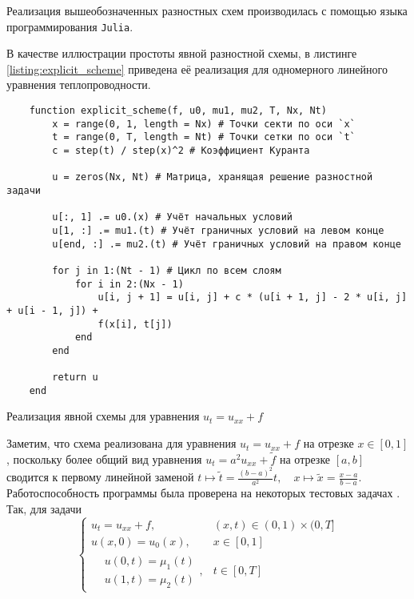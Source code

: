 
Реализация вышеобозначенных разностных схем производилась с помощью языка программирования \texttt{Julia}\cite{bezanson2017julia}. 

В качестве иллюстрации простоты явной разностной схемы, в листинге \ref{listing:explicit_scheme} приведена её реализация для одномерного линейного уравнения теплопроводности.
\begin{listing}
    \begin{verbatim}
    function explicit_scheme(f, u0, mu1, mu2, T, Nx, Nt)
        x = range(0, 1, length = Nx) # Точки секти по оси `x`
        t = range(0, T, length = Nt) # Точки сетки по оси `t`
        c = step(t) / step(x)^2 # Коэффициент Куранта
    
        u = zeros(Nx, Nt) # Матрица, хранящая решение разностной задачи
    
        u[:, 1] .= u0.(x) # Учёт начальных условий
        u[1, :] .= mu1.(t) # Учёт граничных условий на левом конце
        u[end, :] .= mu2.(t) # Учёт граничных условий на правом конце
    
        for j in 1:(Nt - 1) # Цикл по всем слоям
            for i in 2:(Nx - 1)
                u[i, j + 1] = u[i, j] + c * (u[i + 1, j] - 2 * u[i, j] + u[i - 1, j]) + 
                f(x[i], t[j])
            end
        end
    
        return u
    end
    \end{verbatim}
    \caption{Реализация явной схемы для уравнения $u_t = u_{xx} + f$}
    \label{listing:explicit_scheme}
\end{listing}
Заметим, что схема реализована для уравнения $u_t = u_{xx} + f$ на отрезке $x \in [0, 1]$, поскольку более общий вид уравнения $u_t = a^2 u_{xx} + \tilde{f}$ на отрезке $[a, b]$ сводится к первому линейной заменой $ t \mapsto \tilde{t} = \frac{(b - a)^2}{a^2} t, \quad x \mapsto \tilde{x} = \frac{x - a}{b - a}$.
Работоспособность программы была проверена на некоторых тестовых задачах \cite{горюнов2015методы}.
Так, для задачи
\begin{equation*}
    \begin{cases}
        u_t = u_{xx} + f, & (x, t) \in (0, 1) \times (0, T]\\
        u(x, 0) = u_0(x), & x \in [0, 1]\\
        \begin{aligned}
            & \textstyle u(0, t) = \mu_1(t)\\
            & \textstyle u(1, t) = \mu_2(t)
        \end{aligned}, & t \in [0, T]
    \end{cases}
\end{equation*}
